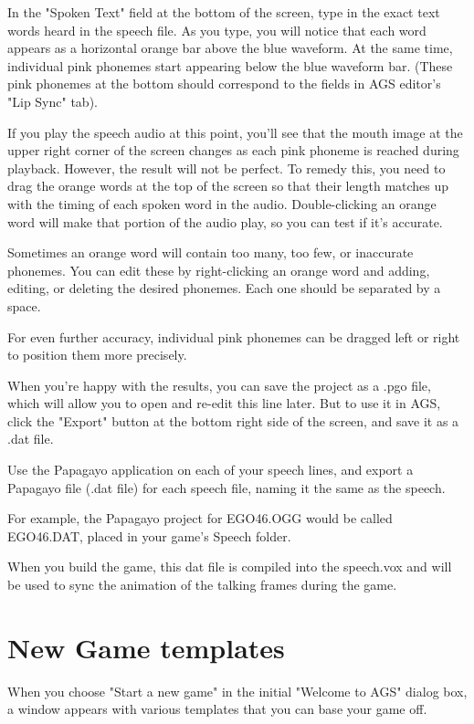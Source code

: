 In the "Spoken Text" field at the bottom of the screen, type in the exact text words heard in the
speech file. As you type, you will notice that each word appears as a horizontal orange bar above
the blue waveform. At the same time, individual pink phonemes start appearing below
the blue waveform bar. (These pink phonemes at the bottom should correspond to the fields
in AGS editor's "Lip Sync" tab).

If you play the speech audio at this point, you'll see that the mouth image at the upper right
corner of the screen changes as each pink phoneme is reached during playback. However, the result
will not be perfect. To remedy this, you need to drag the orange words at the top of the screen
so that their length matches up with the timing of each spoken word in the audio.
Double-clicking an orange word will make that portion of the audio play, so you can test if it's accurate.

Sometimes an orange word will contain too many, too few, or inaccurate phonemes. You can edit these
by right-clicking an orange word and adding, editing, or deleting the desired phonemes.
Each one should be separated by a space.

For even further accuracy, individual pink phonemes can be dragged left or right to position them
more precisely.

When you're happy with the results, you can save the project as a .pgo file, which will allow you
to open and re-edit this line later. But to use it in AGS, click the "Export" button at the
bottom right side of the screen, and save it as a .dat file.

Use the Papagayo application on each of your speech lines, and export a Papagayo file (.dat file)
for each speech file, naming it the same as the speech.

For example, the Papagayo project for EGO46.OGG would be called EGO46.DAT, placed in your game's
Speech folder.

When you build the game, this dat file is compiled into the speech.vox and will be used to sync
the animation of the talking frames during the game.


\section{New Game templates}%

When you choose "Start a new game" in the initial "Welcome to AGS" dialog
box, a window appears with various templates that you can base your game off.

